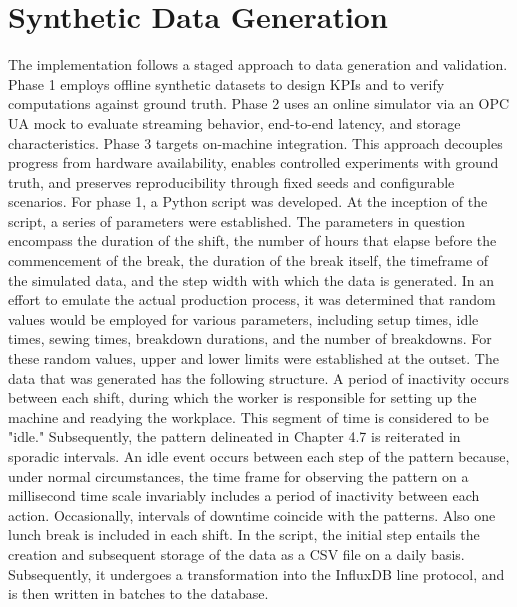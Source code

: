 \section{Synthetic Data Generation}
The implementation follows a staged approach to data generation and validation. Phase 1 employs offline synthetic datasets to design KPIs and to verify computations against ground truth. Phase 2 uses an online simulator via an OPC UA mock to evaluate streaming behavior, end-to-end latency, and storage characteristics. Phase 3 targets on-machine integration. This approach decouples progress from hardware availability, enables controlled experiments with ground truth, and preserves reproducibility through fixed seeds and configurable scenarios.
For phase 1, a Python script was developed. At the inception of the script, a series of parameters were established. The parameters in question encompass the duration of the shift, the number of hours that elapse before the commencement of the break, the duration of the break itself, the timeframe of the simulated data, and the step width with which the data is generated. In an effort to emulate the actual production process, it was determined that random values would be employed for various parameters, including setup times, idle times, sewing times, breakdown durations, and the number of breakdowns. For these random values, upper and lower limits were established at the outset. The data that was generated has the following structure. A period of inactivity occurs between each shift, during which the worker is responsible for setting up the machine and readying the workplace. This segment of time is considered to be "idle." Subsequently, the pattern delineated in Chapter 4.7 is reiterated in sporadic intervals. An idle event occurs between each step of the pattern because, under normal circumstances, the time frame for observing the pattern on a millisecond time scale invariably includes a period of inactivity between each action. Occasionally, intervals of downtime coincide with the patterns. Also one lunch break is included in each shift. In the script, the initial step entails the creation and subsequent storage of the data as a CSV file on a daily basis. Subsequently, it undergoes a transformation into the InfluxDB line protocol, and is then written in batches to the database.
